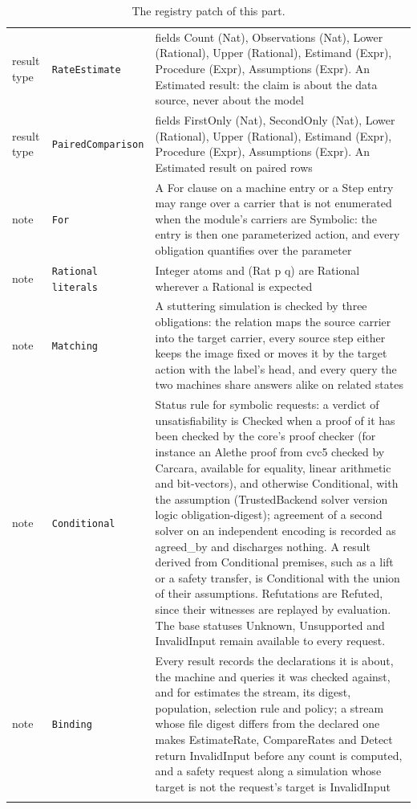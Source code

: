 \documentclass[11pt]{article}
\newcommand{\code}[1]{\texttt{#1}}
\theoremstyle{definition}
\theoremstyle{plain}
\begin{document}
\begin{footnotesize}
\begin{longtable}{>{\raggedright\arraybackslash}p{1.9cm}>{\raggedright\arraybackslash}p{3.3cm}>{\raggedright\arraybackslash}p{9.0cm}}
result type & \code{RateEstimate} & fields Count (Nat), Observations (Nat), Lower (Rational), Upper (Rational), Estimand (Expr), Procedure (Expr), Assumptions (Expr). An Estimated result:\allowbreak{} the claim is about the data source, never about the model\\
result type & \code{PairedComparison} & fields FirstOnly (Nat), SecondOnly (Nat), Lower (Rational), Upper (Rational), Estimand (Expr), Procedure (Expr), Assumptions (Expr). An Estimated result on paired rows\\
note & \code{For} & A For clause on a machine entry or a Step entry may range over a carrier that is not enumerated when the module's carriers are Symbolic:\allowbreak{} the entry is then one parameterized action, and every obligation quantifies over the parameter\\
note & \code{Rational literals} & Integer atoms and (Rat p q) are Rational wherever a Rational is expected\\
note & \code{Matching} & A stuttering simulation is checked by three obligations:\allowbreak{} the relation maps the source carrier into the target carrier, every source step either keeps the image fixed or moves it by the target action with the label's head, and every query the two machines share answers alike on related states\\
note & \code{Conditional} & Status rule for symbolic requests:\allowbreak{} a verdict of unsatisfiability is Checked when a proof of it has been checked by the core's proof checker (for instance an Alethe proof from cvc5 checked by Carcara, available for equality, linear arithmetic and bit-vectors), and otherwise Conditional, with the assumption (TrustedBackend solver version logic obligation-digest); agreement of a second solver on an independent encoding is recorded as agreed\_by and discharges nothing.  A result derived from Conditional premises, such as a lift or a safety transfer, is Conditional with the union of their assumptions.  Refutations are Refuted, since their witnesses are replayed by evaluation.  The base statuses Unknown, Unsupported and InvalidInput remain available to every request.\\
note & \code{Binding} & Every result records the declarations it is about, the machine and queries it was checked against, and for estimates the stream, its digest, population, selection rule and policy; a stream whose file digest differs from the declared one makes EstimateRate, CompareRates and Detect return InvalidInput before any count is computed, and a safety request along a simulation whose target is not the request's target is InvalidInput\\
\bottomrule
\caption{The registry patch of this part.}\label{tab:patch}
\end{longtable}
\end{footnotesize}
\end{document}
